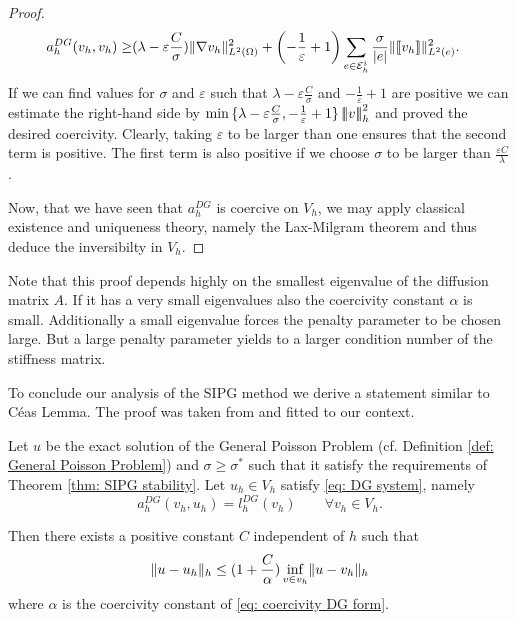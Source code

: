 \begin{proof}
	\begin{align*}
	a_h^{DG}(v_h,v_h)  \geq& (\lambda- \varepsilon \frac C \sigma)
	\lVert \nabla v_h \rVert_{L^2(\Omega)}^2
	+ \left(-\frac 1 \varepsilon +1\right) \sum_{e\in \mathcal{E}_h^i}  \frac \sigma {|e|} \lVert \llbracket v_h \rrbracket \rVert_{L^2(e)}^2.
	\end{align*}
	If we can find values for $\sigma$ and $\varepsilon$ such that $\lambda-\varepsilon \frac C \sigma$ and $-\frac 1 \varepsilon +1$ are positive we can estimate the right-hand side by $\min{\{\lambda-\varepsilon \frac C \sigma,-\frac 1 \varepsilon +1\}} \left| \! \left| \! \left| v \right| \! \right| \! \right|_{h}^2$ and proved the desired coercivity. 
	Clearly, taking $\varepsilon$ to be larger than one ensures that the second term is positive. The first term is also positive if we choose $\sigma$ to be larger than $\frac {\varepsilon C} \lambda$.
	
	Now, that we have seen that $a_h^{DG}$ is coercive on $V_h$, we may apply classical existence and uniqueness theory, namely the Lax-Milgram theorem and thus deduce the inversibilty in $V_h$.
\end{proof}
Note that this proof depends highly on the smallest eigenvalue of the diffusion matrix $A$. If it has a very small eigenvalues also the coercivity constant $\alpha$ is small.
Additionally a small eigenvalue forces the penalty parameter to be chosen large. But a large penalty parameter yields to a larger condition number of the stiffness matrix.

To conclude our analysis of the SIPG method we derive a statement similar to C\'eas Lemma. The proof was taken from \cite[Lemma 10.5.2]{BS2002} and fitted to our context.
\begin{theorem}\label{thm: error estimate}
	Let $u$ be the exact solution of the General Poisson Problem (cf. Definition \ref{def: General Poisson Problem}) and $\sigma \geq \sigma^*$ such that it satisfy the requirements of Theorem \ref{thm: SIPG stability}. Let $u_h \in V_h$ satisfy \eqref{eq: DG system}, namely
	\[
	a_h^{DG}(v_h, u_h) = l^{DG}_h(v_h) \qquad \forall v_h \in V_h.
	\]
\end{theorem}
Then there exists a positive constant $C$ independent of $h$ such that 
\[
\lVert u - u_h  \rVert_{h} \leq (1+\frac C \alpha) \inf_{v \in v_h} \lVert u - v_h \rVert_{h}
\]
where $\alpha$ is the coercivity constant of \eqref{eq: coercivity DG form}. %

